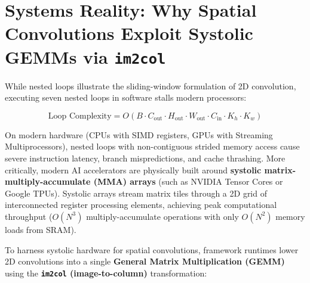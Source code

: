 \documentclass[
  letterpaper,
]{scrbook}
\begin{document}

\section{\texorpdfstring{Systems Reality: Why Spatial Convolutions
Exploit Systolic GEMMs via
\texttt{im2col}}{Systems Reality: Why Spatial Convolutions Exploit Systolic GEMMs via im2col}}\label{systems-reality-why-spatial-convolutions-exploit-systolic-gemms-via-im2col}

While nested loops illustrate the sliding-window formulation of 2D
convolution, executing seven nested loops in software stalls modern
processors:

\[\text{Loop Complexity} = O(B \cdot C_{\text{out}} \cdot H_{\text{out}} \cdot W_{\text{out}} \cdot C_{\text{in}} \cdot K_h \cdot K_w)\]

On modern hardware (CPUs with SIMD registers, GPUs with Streaming
Multiprocessors), nested loops with non-contiguous strided memory access
cause severe instruction latency, branch mispredictions, and cache
thrashing. More critically, modern AI accelerators are physically built
around \textbf{systolic matrix-multiply-accumulate (MMA) arrays} (such
as NVIDIA Tensor Cores or Google TPUs). Systolic arrays stream matrix
tiles through a 2D grid of interconnected register processing elements,
achieving peak computational throughput (\(O(N^3)\) multiply-accumulate
operations with only \(O(N^2)\) memory loads from SRAM).

To harness systolic hardware for spatial convolutions, framework
runtimes lower 2D convolutions into a single \textbf{General Matrix
Multiplication (GEMM)} using the \textbf{\texttt{im2col}
(image-to-column)} transformation:
\end{document}
